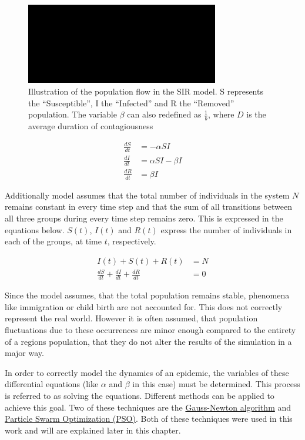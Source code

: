 \begin{figure}
	\begin{center}
		\includegraphics[width=0.75\textwidth]{./figures/SIR.png}
		\caption{Illustration of the population flow in the SIR model. S represents the ``Susceptible'', I
			the ``Infected'' and R the ``Removed'' population. The variable $\beta$ can also redefined
			as $\frac{1}{b}$, where $D$ is the average duration of contagiousness}
		\label{fig:SIR}
	\end{center}
\end{figure}


\begin{align}
	\label{eq:SIR1}
	\frac{dS}{dt} &= -\alpha S I \\
	\frac{dI}{dt} &= \alpha S I - \beta I \\
	\frac{dR}{dt} &= \beta I
\end{align}


Additionally model assumes that the total number of individuals in the system $N$ remains constant in every time step and
that the sum of all transitions between all three groups during every time step remains zero. This is expressed in the equations below.
$S(t)$, $I(t)$ and $R(t)$ express the number of individuals in each of the groups, at time $t$, respectively.

\begin{align}
	\label{eq:SIR2}
	I(t) + S(t) + R(t) &= N \\
	\frac{dS}{dt} + \frac{dI}{dt} + \frac{dR}{dt} &= 0
\end{align}


Since the model assumes, that the total population remains stable, phenomena like immigration or child birth are not accounted
for. This does not correctly represent the real world. However it is often assumed, that population fluctuations
due to these occurrences are minor enough compared to the entirety of a regions population, that they do not alter the results of the
simulation in a major way\cite{??}.\newline


In order to correctly model the dynamics of an epidemic, the variables of these differential
equations (like $\alpha$ and $\beta$ in this case) must be determined. This process is referred to as solving the equations.
Different methods can be applied to achieve this goal. Two of these techniques are the \hyperref[sec:Gauss]{Gauss-Newton algorithm}\cite{Gauss??}
and \hyperref[sec:PSO]{Particle Swarm Optimization (PSO)}\cite{PSO??}. Both of these techniques were used in this work and will are explained
later in this chapter.


